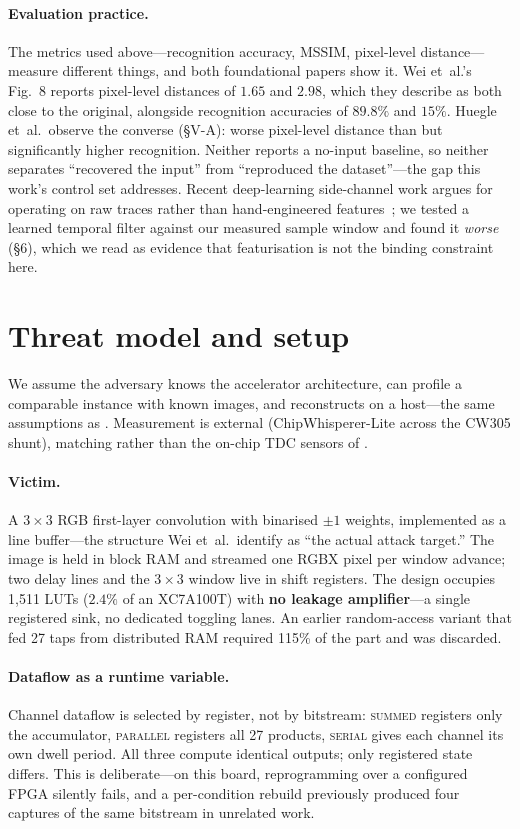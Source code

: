 \documentclass[10pt,conference]{article}
\begin{document}
\paragraph{Evaluation practice.} The metrics used above---recognition accuracy, MSSIM,
pixel-level distance---measure different things, and both foundational papers show it.
Wei et~al.'s Fig.~8 reports pixel-level distances of $1.65$ and $2.98$, which they
describe as both close to the original, alongside recognition accuracies of $89.8\%$ and
$15\%$. Huegle et~al.\ observe the converse (\S V-A): worse pixel-level distance than
\cite{wei2018} but significantly higher recognition. Neither reports a no-input baseline,
so neither separates ``recovered the input'' from ``reproduced the dataset''---the gap
this work's control set addresses. Recent deep-learning side-channel work argues for
operating on raw traces rather than hand-engineered features~\cite{sanjaya2024}; we
tested a learned temporal filter against our measured sample window and found it
\emph{worse} (\S6), which we read as evidence that featurisation is not the binding
constraint here.

\section{Threat model and setup}

We assume the adversary knows the accelerator architecture, can profile a comparable
instance with known images, and reconstructs on a host---the same assumptions as
\cite{wei2018,huegle2023}. Measurement is external (ChipWhisperer-Lite across the CW305
shunt), matching \cite{wei2018} rather than the on-chip TDC sensors of \cite{huegle2023}.

\paragraph{Victim.} A $3\times3$ RGB first-layer convolution with binarised $\pm1$
weights, implemented as a line buffer---the structure Wei et~al.\ identify as ``the
actual attack target.'' The image is held in block RAM and streamed one RGBX pixel per
window advance; two delay lines and the $3\times3$ window live in shift registers. The
design occupies 1{,}511 LUTs ($2.4\%$ of an XC7A100T) with \textbf{no leakage
amplifier}---a single registered sink, no dedicated toggling lanes. An earlier
random-access variant that fed 27 taps from distributed RAM required 115\% of the part
and was discarded.

\paragraph{Dataflow as a runtime variable.} Channel dataflow is selected by register, not
by bitstream: \textsc{summed} registers only the accumulator, \textsc{parallel} registers
all 27 products, \textsc{serial} gives each channel its own dwell period. All three
compute identical outputs; only registered state differs. This is deliberate---on this
board, reprogramming over a configured FPGA silently fails, and a per-condition rebuild
previously produced four captures of the same bitstream in unrelated work.
\end{document}
